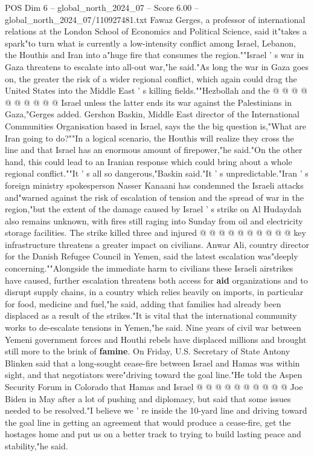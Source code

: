 \begin{textsample}{POS Dim 6 – global\_north\_2024\_07 – Score 6.00 – global\_north\_2024\_07/110927481.txt}
Fawaz Gerges, a professor of international relations at the London School of Economics and Political Science, said it"takes a spark"to turn what is currently a low-intensity conflict among Israel, Lebanon, the Houthis and Iran into a"huge fire that consumes the region.""Israel ' s war in Gaza threatens to escalate into all-out war,"he said."As long the war in Gaza goes on, the greater the risk of a wider regional conflict, which again could drag the United States into the Middle East ' s killing fields.""Hezbollah and the @ @ @ @ @ @ @ @ @ @ Israel unless the latter ends its war against the Palestinians in Gaza,"Gerges added.
Gershon Baskin, Middle East director of the International Communities Organisation based in Israel, says the the big question is,"What are Iran going to do?""In a logical scenario, the Houthis will realize they cross the line and that Israel has an enormous amount of firepower,"he said."On the other hand, this could lead to an Iranian response which could bring about a whole regional conflict.""It ' s all so dangerous,"Baskin said."It ' s unpredictable."Iran ' s foreign ministry spokesperson Nasser Kanaani has condemned the Israeli attacks and"warned against the risk of escalation of tension and the spread of war in the region,"but the extent of the damage caused by Israel ' s strike on Al Hudaydah also remains unknown, with fires still raging into Sunday from oil and electricity storage facilities.
The strike killed three and injured @ @ @ @ @ @ @ @ @ @ key infrastructure threatens a greater impact on civilians.
Anwar Ali, country director for the Danish Refugee Council in Yemen, said the latest escalation was"deeply concerning.""Alongside the immediate harm to civilians these Israeli airstrikes have caused, further escalation threatens both access for \textbf{aid} organizations and to disrupt supply chains, in a country which relies heavily on imports, in particular for food, medicine and fuel,"he said, adding that families had already been displaced as a result of the strikes."It is vital that the international community works to de-escalate tensions in Yemen,"he said.
Nine years of civil war between Yemeni government forces and Houthi rebels have displaced millions and brought still more to the brink of \textbf{famine}.
On Friday, U.S.
Secretary of State Antony Blinken said that a long-sought cease-fire between Israel and Hamas was within sight, and that negotiators were"driving toward the goal line."He told the Aspen Security Forum in Colorado that Hamas and Israel @ @ @ @ @ @ @ @ @ @ Joe Biden in May after a lot of pushing and diplomacy, but said that some issues needed to be resolved."I believe we ' re inside the 10-yard line and driving toward the goal line in getting an agreement that would produce a cease-fire, get the hostages home and put us on a better track to trying to build lasting peace and stability,"he said.

\end{textsample}
